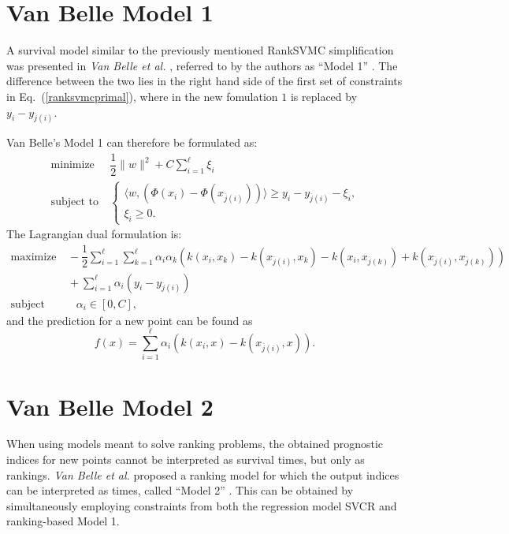 \documentclass[12pt]{report}
\begin{document}
\section{Van Belle Model 1}
A survival model similar to the previously mentioned RankSVMC simplification was presented in \textit{Van Belle et al.} \cite{vanbelle11b}, referred to by the authors as ``Model 1'' \cite{vanbelle11}. The difference between the two lies in the right hand side of the first set of constraints in Eq.\ (\ref{ranksvmcprimal}), where in the new fomulation $1$ is replaced by $y_{i} - y_{\overline{j}(i)}$.

Van Belle's Model 1 can therefore be formulated as:
\begin{equation} \label{model1primal}
\begin{split}
\text{minimize} &\ \dfrac{1}{2}\| w \|^2 + C\sum_{i=1}^{\ell}\xi_{i} \\
\text{subject to} &\ \begin{cases}
\langle w,(\Phi(x_{i}) - \Phi(x_{\overline{j}(i)})) \rangle \geq y_{i} - y_{\overline{j}(i)} - \xi_{i} \text{,}\\
\xi_{i} \geq 0 \text{.}
\end{cases}
\end{split}
\end{equation}
The Lagrangian dual formulation is:
\begin{equation} \label{model1dual}
\begin{split}
\text{maximize} &\
-\dfrac{1}{2}\sum_{i=1}^{\ell}\sum_{k=1}^{\ell}\alpha_{i}\alpha_{k}(k(x_{i},x_{k})-k(x_{\overline{j}(i)},x_{k})-k(x_{i},x_{\overline{j}(k)})+k(x_{\overline{j}(i)},x_{\overline{j}(k)})) \\
&\ + \sum_{i=1}^{\ell}\alpha_{i}(y_{i} - y_{\overline{j}(i)}) \\
\text{subject to} &\quad \alpha_{i} \in [0,C] \text{,}
\end{split}
\end{equation}
and the prediction for a new point can be found as
\begin{equation} \label{model1f}
f(x) = \sum_{i=1}^{\ell}\alpha_{i}(k(x_{i},x) - k(x_{\overline{j}(i)},x)) \text{.}
\end{equation}

\section{Van Belle Model 2}
When using models meant to solve ranking problems, the obtained prognostic indices for new points cannot be interpreted as survival times, but only as rankings. \textit{Van Belle et al.} proposed a ranking model for which the output indices can be interpreted as times, called ``Model 2'' \cite{vanbelle11}. This can be obtained by simultaneously employing constraints from both the regression model SVCR and ranking-based Model 1.
\end{document}
